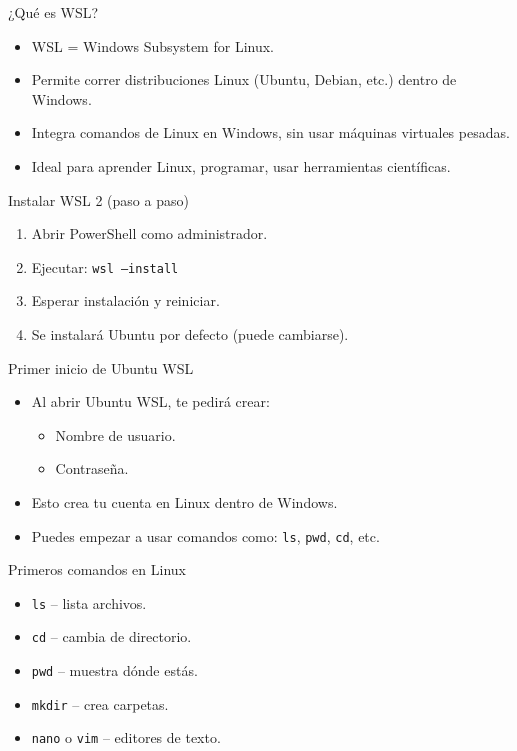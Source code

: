 \documentclass[aspectratio=169,professionalfonts]{beamer}
\begin{document}
\begin{frame}{¿Qué es WSL?}
  \begin{itemize}
    \item WSL = Windows Subsystem for Linux.
    \item Permite correr distribuciones Linux (Ubuntu, Debian, etc.) dentro de Windows.
    \item Integra comandos de Linux en Windows, sin usar máquinas virtuales pesadas.
    \item Ideal para aprender Linux, programar, usar herramientas científicas.
  \end{itemize}
\end{frame}

\begin{frame}{Instalar WSL 2 (paso a paso)}
  \begin{enumerate}
    \item Abrir PowerShell como administrador.
    \item Ejecutar: \texttt{wsl --install}
    \item Esperar instalación y reiniciar.
    \item Se instalará Ubuntu por defecto (puede cambiarse).
  \end{enumerate}
\end{frame}

\begin{frame}{Primer inicio de Ubuntu WSL}
  \begin{itemize}
    \item Al abrir Ubuntu WSL, te pedirá crear:
      \begin{itemize}
        \item Nombre de usuario.
        \item Contraseña.
      \end{itemize}
    \item Esto crea tu cuenta en Linux dentro de Windows.
    \item Puedes empezar a usar comandos como: \texttt{ls}, \texttt{pwd}, \texttt{cd}, etc.
  \end{itemize}
\end{frame}


\begin{frame}{Primeros comandos en Linux}
  \begin{itemize}
    \item \texttt{ls} – lista archivos.
    \item \texttt{cd} – cambia de directorio.
    \item \texttt{pwd} – muestra dónde estás.
    \item \texttt{mkdir} – crea carpetas.
    \item \texttt{nano} o \texttt{vim} – editores de texto.
  \end{itemize}
\end{frame}
\end{document}
